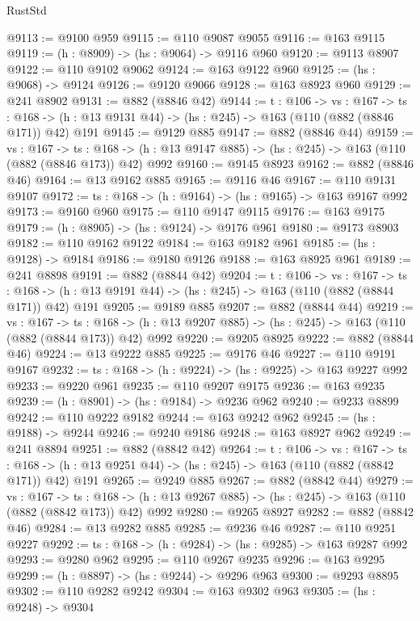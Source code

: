 \begin{lexlean}{RustStd}
\begin{coremodule}
@9113 := @9100 @959
@9115 := @110 @9087 @9055
@9116 := @163 @9115
@9119 := (h : @8909) -> (hs : @9064) -> @9116 @960
@9120 := @9113 @8907
@9122 := @110 @9102 @9062
@9124 := @163 @9122 @960
@9125 := (hs : @9068) -> @9124
@9126 := @9120 @9066
@9128 := @163 @8923 @960
@9129 := @241 @8902
@9131 := @882 (@8846 @42)
@9144 := {t : @106} ->
  {vs : @167} ->
  {ts : @168} -> (h : @13 @9131 @44) -> (hs : @245) -> @163 (@110 (@882 (@8846 @171)) @42) @191
@9145 := @9129 @885
@9147 := @882 (@8846 @44)
@9159 := {vs : @167} ->
  {ts : @168} -> (h : @13 @9147 @885) -> (hs : @245) -> @163 (@110 (@882 (@8846 @173)) @42) @992
@9160 := @9145 @8923
@9162 := @882 (@8846 @46)
@9164 := @13 @9162 @885
@9165 := @9116 @46
@9167 := @110 @9131 @9107
@9172 := {ts : @168} -> (h : @9164) -> (hs : @9165) -> @163 @9167 @992
@9173 := @9160 @960
@9175 := @110 @9147 @9115
@9176 := @163 @9175
@9179 := (h : @8905) -> (hs : @9124) -> @9176 @961
@9180 := @9173 @8903
@9182 := @110 @9162 @9122
@9184 := @163 @9182 @961
@9185 := (hs : @9128) -> @9184
@9186 := @9180 @9126
@9188 := @163 @8925 @961
@9189 := @241 @8898
@9191 := @882 (@8844 @42)
@9204 := {t : @106} ->
  {vs : @167} ->
  {ts : @168} -> (h : @13 @9191 @44) -> (hs : @245) -> @163 (@110 (@882 (@8844 @171)) @42) @191
@9205 := @9189 @885
@9207 := @882 (@8844 @44)
@9219 := {vs : @167} ->
  {ts : @168} -> (h : @13 @9207 @885) -> (hs : @245) -> @163 (@110 (@882 (@8844 @173)) @42) @992
@9220 := @9205 @8925
@9222 := @882 (@8844 @46)
@9224 := @13 @9222 @885
@9225 := @9176 @46
@9227 := @110 @9191 @9167
@9232 := {ts : @168} -> (h : @9224) -> (hs : @9225) -> @163 @9227 @992
@9233 := @9220 @961
@9235 := @110 @9207 @9175
@9236 := @163 @9235
@9239 := (h : @8901) -> (hs : @9184) -> @9236 @962
@9240 := @9233 @8899
@9242 := @110 @9222 @9182
@9244 := @163 @9242 @962
@9245 := (hs : @9188) -> @9244
@9246 := @9240 @9186
@9248 := @163 @8927 @962
@9249 := @241 @8894
@9251 := @882 (@8842 @42)
@9264 := {t : @106} ->
  {vs : @167} ->
  {ts : @168} -> (h : @13 @9251 @44) -> (hs : @245) -> @163 (@110 (@882 (@8842 @171)) @42) @191
@9265 := @9249 @885
@9267 := @882 (@8842 @44)
@9279 := {vs : @167} ->
  {ts : @168} -> (h : @13 @9267 @885) -> (hs : @245) -> @163 (@110 (@882 (@8842 @173)) @42) @992
@9280 := @9265 @8927
@9282 := @882 (@8842 @46)
@9284 := @13 @9282 @885
@9285 := @9236 @46
@9287 := @110 @9251 @9227
@9292 := {ts : @168} -> (h : @9284) -> (hs : @9285) -> @163 @9287 @992
@9293 := @9280 @962
@9295 := @110 @9267 @9235
@9296 := @163 @9295
@9299 := (h : @8897) -> (hs : @9244) -> @9296 @963
@9300 := @9293 @8895
@9302 := @110 @9282 @9242
@9304 := @163 @9302 @963
@9305 := (hs : @9248) -> @9304

\end{coremodule}
\end{lexlean}

